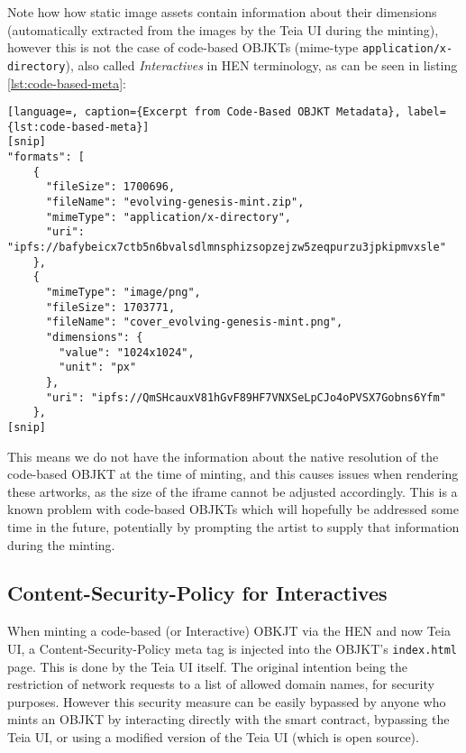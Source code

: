 Note how how static image assets contain information about their dimensions (automatically extracted from the images by the Teia UI during the minting), however this is not the case of code-based OBJKTs (mime-type \texttt{application/x-directory}), also called \emph{Interactives} in HEN terminology, as can be seen in listing \autoref{lst:code-based-meta}:

\begin{lstlisting}[language=, caption={Excerpt from Code-Based OBJKT Metadata}, label={lst:code-based-meta}]
[snip]
"formats": [
    {
      "fileSize": 1700696,
      "fileName": "evolving-genesis-mint.zip",
      "mimeType": "application/x-directory",
      "uri": "ipfs://bafybeicx7ctb5n6bvalsdlmnsphizsopzejzw5zeqpurzu3jpkipmvxsle"
    },
    {
      "mimeType": "image/png",
      "fileSize": 1703771,
      "fileName": "cover_evolving-genesis-mint.png",
      "dimensions": {
        "value": "1024x1024",
        "unit": "px"
      },
      "uri": "ipfs://QmSHcauxV81hGvF89HF7VNXSeLpCJo4oPVSX7Gobns6Yfm"
    },
[snip]
\end{lstlisting}

This means we do not have the information about the native resolution of the code-based OBJKT at the time of minting, and this causes issues when rendering these artworks, as the size of the iframe cannot be adjusted accordingly. This is a known problem with code-based OBJKTs which will hopefully be addressed some time in the future, potentially by prompting the artist to supply that information during the minting.

\subsection{Content-Security-Policy for Interactives}

When minting a code-based (or Interactive) OBKJT via the HEN and now Teia UI, a Content-Security-Policy meta tag is injected into the OBJKT's \texttt{index.html} page. This is done by the Teia UI itself. The original intention being the restriction of network requests to a list of allowed domain names, for security purposes. However this security measure can be easily bypassed by anyone who mints an OBJKT by interacting directly with the smart contract, bypassing the Teia UI, or using a modified version of the Teia UI (which is open source).

